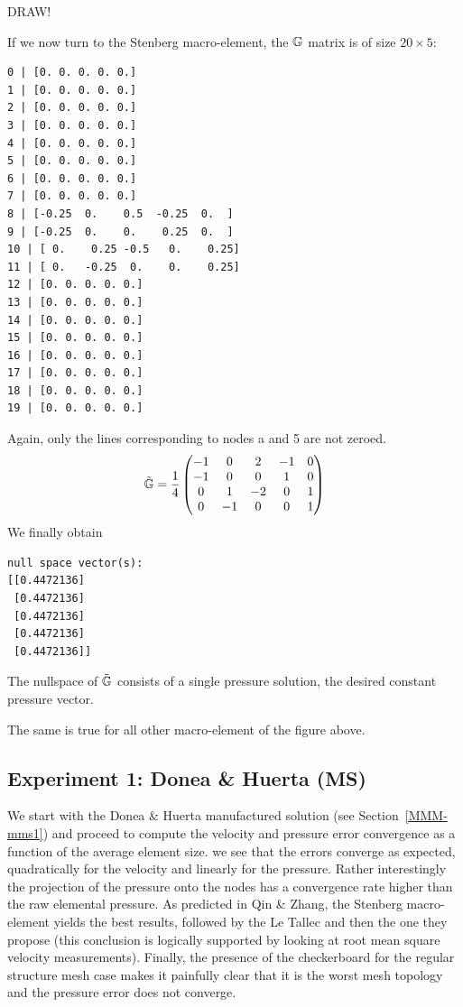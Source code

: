 {\color{red} DRAW!}


If we now turn to the Stenberg macro-element, the ${\mathbb{G}}$ matrix 
is of size  $20\times 5$: 
{\small
\begin{verbatim}
0 | [0. 0. 0. 0. 0.]
1 | [0. 0. 0. 0. 0.]
2 | [0. 0. 0. 0. 0.]
3 | [0. 0. 0. 0. 0.]
4 | [0. 0. 0. 0. 0.]
5 | [0. 0. 0. 0. 0.]
6 | [0. 0. 0. 0. 0.]
7 | [0. 0. 0. 0. 0.]
8 | [-0.25  0.    0.5  -0.25  0.  ]
9 | [-0.25  0.    0.    0.25  0.  ]
10 | [ 0.    0.25 -0.5   0.    0.25]
11 | [ 0.   -0.25  0.    0.    0.25]
12 | [0. 0. 0. 0. 0.]
13 | [0. 0. 0. 0. 0.]
14 | [0. 0. 0. 0. 0.]
15 | [0. 0. 0. 0. 0.]
16 | [0. 0. 0. 0. 0.]
17 | [0. 0. 0. 0. 0.]
18 | [0. 0. 0. 0. 0.]
19 | [0. 0. 0. 0. 0.]
\end{verbatim}
}
Again, only the lines corresponding to nodes a and 5 are not zeroed.
\[
\tilde{{\mathbb{G}}}=
\frac14
\begin{pmatrix}
-1 & 0 & 2 &-1 &0 \\
-1 & 0 & 0 & 1 &0 \\
 0 & 1 &-2 & 0 &1 \\
 0 &-1 & 0 & 0 &1
\end{pmatrix}
\]
We finally obtain
\begin{verbatim}
null space vector(s):
[[0.4472136]
 [0.4472136]
 [0.4472136]
 [0.4472136]
 [0.4472136]]
\end{verbatim}
The nullspace of $\tilde{{\mathbb{G}}}$ consists of a single pressure solution, 
the desired constant pressure vector. 

The same is true for all other macro-element of the figure above. 





\newpage
\subsection*{Experiment 1: Donea \& Huerta (MS)}

We start with the Donea \& Huerta manufactured solution (see Section~\ref{MMM-mms1}) and 
proceed to compute the velocity and pressure error convergence as a function of the 
average element size.
we see that the errors converge as expected, quadratically for the velocity and linearly for the pressure.
Rather interestingly the projection of the pressure onto the nodes has a convergence rate 
higher than the raw elemental pressure. As predicted in Qin \& Zhang, the Stenberg macro-element 
yields the best results, followed by the Le Tallec and then the one they propose (this conclusion 
is logically supported by looking at root mean square velocity measurements). 
Finally, the presence of the checkerboard for the regular structure mesh case
makes it painfully clear that it is the worst mesh topology 
and the pressure error does not converge.  

